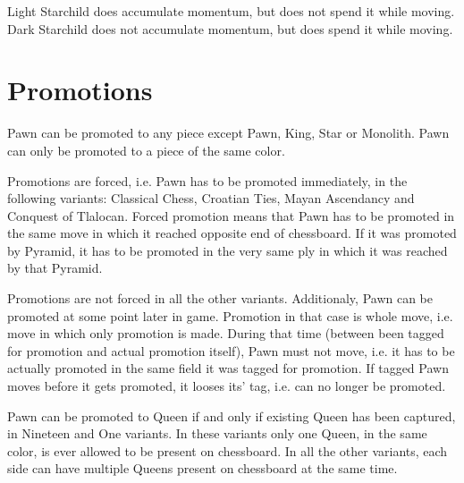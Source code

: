 Light Starchild does accumulate momentum, but does not spend it while moving.
Dark Starchild does not accumulate momentum, but does spend it while moving.

\section*{Promotions}
\label{sec:Definitions/Promotions}

Pawn can be promoted to any piece except Pawn, King, Star or Monolith.
Pawn can only be promoted to a piece of the same color.

Promotions are forced, i.e. Pawn has to be promoted immediately, in the following
variants: Classical Chess, Croatian Ties, Mayan Ascendancy and Conquest of Tlalocan.
Forced promotion means that Pawn has to be promoted in the same move in which it
reached opposite end of chessboard. If it was promoted by Pyramid, it has to be
promoted in the very same ply in which it was reached by that Pyramid.

Promotions are not forced in all the other variants. Additionaly, Pawn can be promoted
at some point later in game. Promotion in that case is whole move, i.e. move in which
only promotion is made. During that time (between been tagged for promotion and actual
promotion itself), Pawn must not move, i.e. it has to be actually promoted in the same
field it was tagged for promotion. If tagged Pawn moves before it gets promoted, it
looses its' tag, i.e. can no longer be promoted.

Pawn can be promoted to Queen if and only if existing Queen has been captured, in
Nineteen and One variants. In these variants only one Queen, in the same color, is
ever allowed to be present on chessboard. In all the other variants, each side can
have multiple Queens present on chessboard at the same time.

\clearpage %
